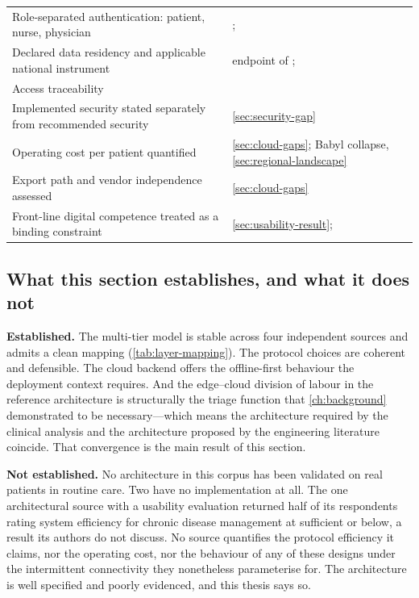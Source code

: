 \documentclass[12pt,a4paper,oneside]{report}
\begin{document}
\begin{table}[htbp]
\begin{tabularx}{\textwidth}{@{}X >{\raggedright\arraybackslash}p{5.9cm}@{}}
Role-separated authentication: patient, nurse, physician & \textcite{efendi2025}; \textcite{yazdani2018} \\
Declared data residency and applicable national instrument & endpoint of \textcite{efendi2025}; \textcite{dodoo2022} \\
Access traceability & \textcite{mucchi2021} \\
Implemented security stated separately from recommended security & \cref{sec:security-gap} \\
Operating cost per patient quantified & \cref{sec:cloud-gaps}; Babyl collapse, \cref{sec:regional-landscape} \\
Export path and vendor independence assessed & \cref{sec:cloud-gaps} \\
Front-line digital competence treated as a binding constraint & \cref{sec:usability-result}; \textcite{mihevc2025} \\
\bottomrule
\end{tabularx}
\end{table}

\subsection{What this section establishes, and what it does not}\label{sec:cloud-conclusion}

\textbf{Established.} The multi-tier model is stable across four independent sources and admits a clean mapping (\cref{tab:layer-mapping}). The protocol choices are coherent and defensible. The cloud backend offers the offline-first behaviour the deployment context requires. And the edge--cloud division of labour in the reference architecture is structurally the triage function that \cref{ch:background} demonstrated to be necessary---which means the architecture required by the clinical analysis and the architecture proposed by the engineering literature coincide. That convergence is the main result of this section.

\textbf{Not established.} No architecture in this corpus has been validated on real patients in routine care. Two have no implementation at all. The one architectural source with a usability evaluation returned half of its respondents rating system efficiency for chronic disease management at sufficient or below, a result its authors do not discuss. No source quantifies the protocol efficiency it claims, nor the operating cost, nor the behaviour of any of these designs under the intermittent connectivity they nonetheless parameterise for. The architecture is well specified and poorly evidenced, and this thesis says so.
\end{document}
